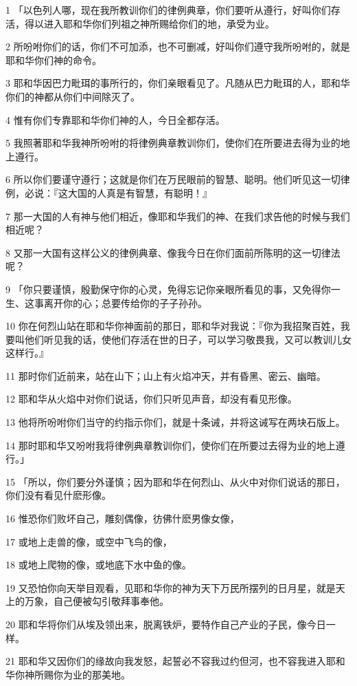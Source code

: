 \par 1 「以色列人哪，现在我所教训你们的律例典章，你们要听从遵行，好叫你们存活，得以进入耶和华你们列祖之神所赐给你们的地，承受为业。
\par 2 所吩咐你们的话，你们不可加添，也不可删减，好叫你们遵守我所吩咐的，就是耶和华你们神的命令。
\par 3 耶和华因巴力毗珥的事所行的，你们亲眼看见了。凡随从巴力毗珥的人，耶和华你们的神都从你们中间除灭了。
\par 4 惟有你们专靠耶和华你们神的人，今日全都存活。
\par 5 我照著耶和华我神所吩咐的将律例典章教训你们，使你们在所要进去得为业的地上遵行。
\par 6 所以你们要谨守遵行；这就是你们在万民眼前的智慧、聪明。他们听见这一切律例，必说：『这大国的人真是有智慧，有聪明！』
\par 7 那一大国的人有神与他们相近，像耶和华我们的神、在我们求告他的时候与我们相近呢？
\par 8 又那一大国有这样公义的律例典章、像我今日在你们面前所陈明的这一切律法呢？
\par 9 「你只要谨慎，殷勤保守你的心灵，免得忘记你亲眼所看见的事，又免得你一生、这事离开你的心；总要传给你的子子孙孙。
\par 10 你在何烈山站在耶和华你神面前的那日，耶和华对我说：『你为我招聚百姓，我要叫他们听见我的话，使他们存活在世的日子，可以学习敬畏我，又可以教训儿女这样行。』
\par 11 那时你们近前来，站在山下；山上有火焰冲天，并有昏黑、密云、幽暗。
\par 12 耶和华从火焰中对你们说话，你们只听见声音，却没有看见形像。
\par 13 他将所吩咐你们当守的约指示你们，就是十条诫，并将这诫写在两块石版上。
\par 14 那时耶和华又吩咐我将律例典章教训你们，使你们在所要过去得为业的地上遵行。」
\par 15 「所以，你们要分外谨慎；因为耶和华在何烈山、从火中对你们说话的那日，你们没有看见什麽形像。
\par 16 惟恐你们败坏自己，雕刻偶像，彷佛什麽男像女像，
\par 17 或地上走兽的像，或空中飞鸟的像，
\par 18 或地上爬物的像，或地底下水中鱼的像。
\par 19 又恐怕你向天举目观看，见耶和华你的神为天下万民所摆列的日月星，就是天上的万象，自己便被勾引敬拜事奉他。
\par 20 耶和华将你们从埃及领出来，脱离铁炉，要特作自己产业的子民，像今日一样。
\par 21 耶和华又因你们的缘故向我发怒，起誓必不容我过约但河，也不容我进入耶和华你神所赐你为业的那美地。
